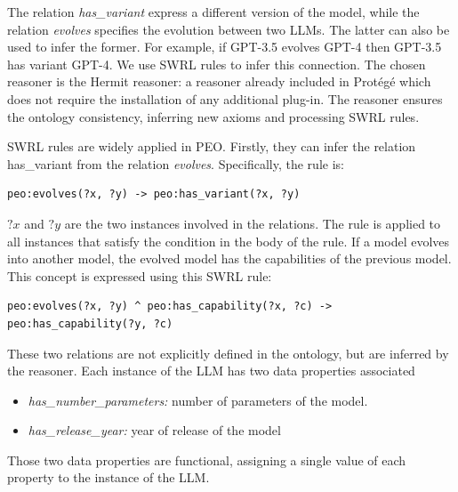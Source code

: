 
The relation \textit{has\_variant} express a different version of the model, while the relation \textit{evolves} specifies the evolution between two LLMs. 
The latter can also be used to infer the former.
For example, if GPT-3.5 evolves GPT-4 then GPT-3.5 has variant GPT-4.
We use SWRL rules to infer this connection. 
The chosen reasoner is the Hermit reasoner\cite{glimm2014hermit}: a reasoner already included in Protégé which does not require the installation of any additional plug-in.
The reasoner ensures the ontology consistency, inferring new axioms and processing SWRL rules.

SWRL rules are widely applied in PEO.
Firstly, they can infer the relation has\_variant from the relation  \textit{evolves}. Specifically, the rule is:
\begin{lstlisting}
peo:evolves(?x, ?y) -> peo:has_variant(?x, ?y)
\end{lstlisting}
$?x$ and $?y$ are the two instances involved in the relations.
The rule is applied to all instances that satisfy the condition in the body of the rule.
If a model evolves into another model, the evolved model has the capabilities of the previous model.
This concept is expressed using this SWRL rule:
\begin{lstlisting}
peo:evolves(?x, ?y) ^ peo:has_capability(?x, ?c) -> peo:has_capability(?y, ?c)
\end{lstlisting}
These two relations are not explicitly defined in the ontology, but are inferred by the reasoner. %
Each instance of the LLM has two data properties associated 
\begin{itemize}
    \item \textit{has\_number\_parameters:} number of parameters of the model.

    \item \textit{has\_release\_year:} year of release of the model
\end{itemize}
Those two data properties are functional, assigning a single value of each property to the instance of the LLM.

